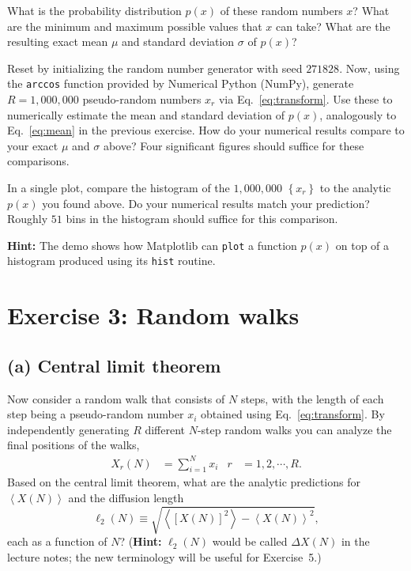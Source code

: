\documentclass[12 pt]{article} %
\newcommand{\si}{\ensuremath{\sigma} }
\newcommand{\vev}[1]{\ensuremath{\left\langle #1 \right\rangle} }
\newcommand{\eq}[1]{Eq.~\ref{#1}}
\newcommand{\showmarks}[1]{\rightline{\texttt{[#1 marks]}}} %
\begin{document}
What is the probability distribution $p(x)$ of these random numbers $x$?
What are the minimum and maximum possible values that $x$ can take?
What are the resulting exact mean $\mu$ and standard deviation \si of $p(x)$?

\showmarks{5}

Reset by initializing the random number generator with seed $271828$.
Now, using the \texttt{arccos} function provided by Numerical Python (NumPy), generate $R = 1{,}000{,}000$ pseudo-random numbers $x_r$ via \eq{eq:transform}.
Use these to numerically estimate the mean and standard deviation of $p(x)$, analogously to \eq{eq:mean} in the previous exercise.
How do your numerical results compare to your exact $\mu$ and \si above?
Four significant figures should suffice for these comparisons.

\showmarks{5}

In a single plot, compare the histogram of the $1{,}000{,}000$ $\left\{x_r\right\}$ to the analytic $p(x)$ you found above.
Do your numerical results match your prediction?
Roughly $51$ bins in the histogram should suffice for this comparison.

\textbf{Hint:} The demo shows how Matplotlib can \texttt{plot} a function $p(x)$ on top of a histogram produced using its \texttt{hist} routine.

\showmarks{5}



\newpage %
\section*{Exercise 3: Random walks}
\subsection*{(a) Central limit theorem}
Now consider a random walk that consists of $N$ steps, with the length of each step being a pseudo-random number $x_i$ obtained using \eq{eq:transform}.
By independently generating $R$ different $N$-step random walks you can analyze the final positions of the walks,
\begin{align*}
  X_r(N) & = \sum_{i = 1}^N x_i &
  r & = 1, 2, \cdots, R.
\end{align*}
Based on the central limit theorem, what are the analytic predictions for $\vev{X(N)}$ and the diffusion length
\begin{equation*}
  \ell_2(N) \equiv \sqrt{\vev{\left[X(N)\right]^2} - \vev{X(N)}^2},
\end{equation*}
each as a function of $N$?
(\textbf{Hint:} $\ell_2(N)$ would be called $\Delta X(N)$ in the lecture notes; the new terminology will be useful for Exercise~5.)
\end{document}
